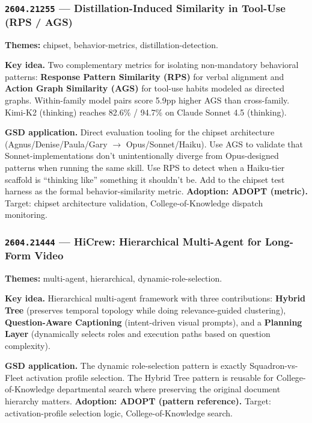\documentclass[11pt,letterpaper]{article}
\newcommand{\arxivid}[1]{\texttt{\textcolor{accent}{#1}}}
\newcommand{\paperhead}[2]{\noindent\textbf{\sffamily\textcolor{secondary}{#1}} \textemdash{} #2}
\begin{document}
\subsubsection{\arxivid{2604.21255} --- Distillation-Induced Similarity in Tool-Use (RPS / AGS)}

\paperhead{Themes:}{chipset, behavior-metrics, distillation-detection.}

\textbf{Key idea.} Two complementary metrics for isolating non-mandatory behavioral patterns: \textbf{Response Pattern Similarity (RPS)} for verbal alignment and \textbf{Action Graph Similarity (AGS)} for tool-use habits modeled as directed graphs. Within-family model pairs score 5.9pp higher AGS than cross-family. Kimi-K2 (thinking) reaches 82.6\% / 94.7\% on Claude Sonnet 4.5 (thinking).

\textbf{GSD application.} Direct evaluation tooling for the chipset architecture (Agnus/Denise/Paula/Gary $\to$ Opus/Sonnet/Haiku). Use AGS to validate that Sonnet-implementations don't unintentionally diverge from Opus-designed patterns when running the same skill. Use RPS to detect when a Haiku-tier scaffold is ``thinking like'' something it shouldn't be. Add to the chipset test harness as the formal behavior-similarity metric. \textbf{Adoption: ADOPT (metric).} Target: chipset architecture validation, College-of-Knowledge dispatch monitoring.

\subsubsection{\arxivid{2604.21444} --- HiCrew: Hierarchical Multi-Agent for Long-Form Video}

\paperhead{Themes:}{multi-agent, hierarchical, dynamic-role-selection.}

\textbf{Key idea.} Hierarchical multi-agent framework with three contributions: \textbf{Hybrid Tree} (preserves temporal topology while doing relevance-guided clustering), \textbf{Question-Aware Captioning} (intent-driven visual prompts), and a \textbf{Planning Layer} (dynamically selects roles and execution paths based on question complexity).

\textbf{GSD application.} The dynamic role-selection pattern is exactly Squadron-vs-Fleet activation profile selection. The Hybrid Tree pattern is reusable for College-of-Knowledge departmental search where preserving the original document hierarchy matters. \textbf{Adoption: ADOPT (pattern reference).} Target: activation-profile selection logic, College-of-Knowledge search.
\end{document}
